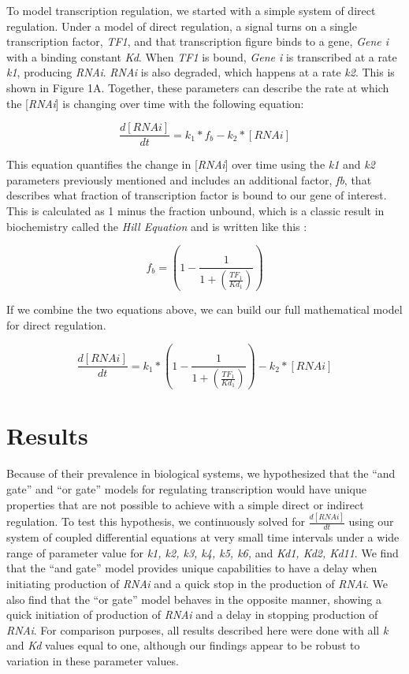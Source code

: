 \documentclass{article}
\begin{document}
To model transcription regulation, we started with a simple system of direct regulation. Under a model of direct regulation, a signal turns on a single transcription factor, \textit{TF1}, and that transcription figure binds to a gene, \textit{Gene i} with a binding constant \textit{Kd}. When \textit{TF1} is bound, \textit{Gene i} is transcribed at a rate \textit{k1}, producing \textit{RNAi}. \textit{RNAi} is also degraded, which happens at a rate \textit{k2}. This is shown in Figure 1A. Together, these parameters can describe the rate at which the [\textit{RNAi}] is changing over time with the following equation:

\[
\frac{d[RNAi]}{dt} = k_1 * f_b - k_2 * [RNAi]
\]

This equation quantifies the change in [\textit{RNAi}] over time using the \textit{k1} and \textit{k2} parameters previously mentioned and includes an additional factor, \textit{fb}, that describes what fraction of transcription factor is bound to our gene of interest. This is calculated as 1 minus the fraction unbound, which is a classic result in biochemistry called the \textit{Hill Equation} and is written like this \cite{Hill2008}:

\[
f_b = \left(1 - \frac{1}{1 + \left(\frac{TF_1}{Kd_1}\right)}\right)
\]

If we combine the two equations above, we can build our full mathematical model for direct regulation. 

\[
\frac{d[RNAi]}{dt} = k_1 * \left(1 - \frac{1}{1 + \left(\frac{TF_1}{Kd_1}\right)}\right) - k_2 * [RNAi]
\]





\section{Results}

Because of their prevalence in biological systems, we hypothesized that the ``and gate'' and ``or gate'' models for regulating transcription would have unique properties that are not possible to achieve with a simple direct or indirect regulation. To test this hypothesis, we continuously solved for \(\frac{d[RNAi]}{dt}\) using our system of coupled differential equations at very small time intervals under a wide range of parameter value for \textit{k1, k2, k3, k4, k5, k6,} and \textit{Kd1, Kd2, Kd11}. We find that the ``and gate'' model provides unique capabilities to have a delay when initiating production of \textit{RNAi} and a quick stop in the production of \textit{RNAi}. We also find that the ``or gate'' model behaves in the opposite manner, showing a quick initiation of production of \textit{RNAi} and a delay in stopping production of \textit{RNAi}. For comparison purposes, all results described here were done with all \textit{k} and \textit{Kd} values equal to one, although our findings appear to be robust to variation in these parameter values. 
\end{document}
